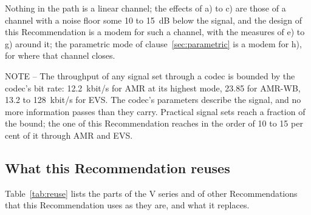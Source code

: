 \documentclass[a4paper,11pt]{article}
\newcommand{\itunote}[1]{\par{\small NOTE -- #1}\par}
\newcommand{\kbs}{kbit/s}
\begin{document}
Nothing in the path is a linear channel; the effects of a) to c) are
those of a channel with a noise floor some 10 to 15~dB below the signal,
and the design of this Recommendation is a modem for such a channel, with
the measures of e) to g) around it; the parametric mode of
clause~\ref{sec:parametric} is a modem for h), for where that channel
closes.

\itunote{The throughput of any signal set through a codec is bounded by
the codec's bit rate: 12.2~\kbs{} for AMR at its highest mode, 23.85 for
AMR-WB, 13.2 to 128~\kbs{} for EVS.  The codec's parameters describe the
signal, and no more information passes than they carry.  Practical signal
sets reach a fraction of the bound; the one of this Recommendation
reaches in the order of 10 to 15 per cent of it through AMR and EVS.}

\subsection{What this Recommendation reuses}
Table~\ref{tab:reuse} lists the parts of the V series and of other
Recommendations that this Recommendation uses as they are, and what it
replaces.
\end{document}
